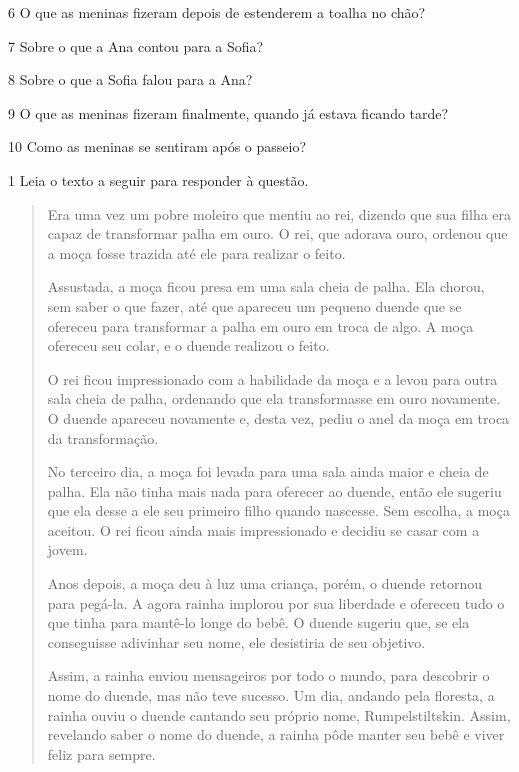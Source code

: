 \num{6} O que as meninas fizeram depois de estenderem a toalha no chão?



\num{7} Sobre o que a Ana contou para a Sofia?



\num{8} Sobre o que a Sofia falou para a Ana?



\num{9} O que as meninas fizeram finalmente, quando já estava ficando tarde?



\num{10} Como as meninas se sentiram após o passeio?




\num{1} Leia o texto a seguir para responder à questão.

\begin{quote}
Era uma vez um pobre moleiro que mentiu ao rei, dizendo que sua filha
era capaz de transformar palha em ouro. O rei, que adorava ouro, ordenou
que a moça fosse trazida até ele para realizar o feito.

Assustada, a moça ficou presa em uma sala cheia de palha. Ela chorou,
sem saber o que fazer, até que apareceu um pequeno duende que se
ofereceu para transformar a palha em ouro em troca de algo. A moça
ofereceu seu colar, e o duende realizou o feito.

O rei ficou impressionado com a habilidade da moça e a levou para outra
sala cheia de palha, ordenando que ela transformasse em ouro novamente.
O duende apareceu novamente e, desta vez, pediu o anel da moça em troca
da transformação.

No terceiro dia, a moça foi levada para uma sala ainda maior e cheia de
palha. Ela não tinha mais nada para oferecer ao duende, então ele
sugeriu que ela desse a ele seu primeiro filho quando nascesse. Sem
escolha, a moça aceitou. O rei ficou ainda mais impressionado e decidiu
se casar com a jovem.

Anos depois, a moça deu à luz uma criança, porém, o duende retornou para
pegá-la. A agora rainha implorou por sua liberdade e ofereceu tudo o que
tinha para mantê-lo longe do bebê. O duende sugeriu que, se ela
conseguisse adivinhar seu nome, ele desistiria de seu objetivo.

Assim, a rainha enviou mensageiros por todo o mundo, para descobrir o
nome do duende, mas não teve sucesso. Um dia, andando pela floresta, a
rainha ouviu o duende cantando seu próprio nome, Rumpelstiltskin. Assim,
revelando saber o nome do duende, a rainha pôde manter seu bebê e viver
feliz para sempre.
\end{quote}

